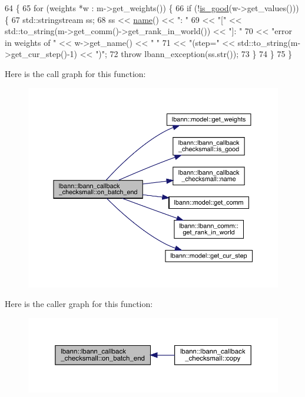 \begin{DoxyCode}
64                                                      \{
65   \textcolor{keywordflow}{for} (weights *w : m->get\_weights()) \{
66     \textcolor{keywordflow}{if} (!\hyperlink{classlbann_1_1lbann__callback__checksmall_afe78f539ba3b2ad3e6ae8c468850052c}{is\_good}(w->get\_values())) \{
67       std::stringstream ss;
68       ss << \hyperlink{classlbann_1_1lbann__callback__checksmall_acbdd897ecbe5a27b59db15ae7662e0f9}{name}() << \textcolor{stringliteral}{": "}
69          << \textcolor{stringliteral}{"["} << std::to\_string(m->get\_comm()->get\_rank\_in\_world()) << \textcolor{stringliteral}{"]: "}
70          << \textcolor{stringliteral}{"error in weights of "} << w->get\_name() << \textcolor{stringliteral}{" "}
71          << \textcolor{stringliteral}{"(step="} << std::to\_string(m->get\_cur\_step()-1) << \textcolor{stringliteral}{")"};
72       \textcolor{keywordflow}{throw} lbann\_exception(ss.str());
73     \}
74   \}
75 \}
\end{DoxyCode}
Here is the call graph for this function\+:\nopagebreak
\begin{figure}[H]
\begin{center}
\leavevmode
\includegraphics[width=350pt]{classlbann_1_1lbann__callback__checksmall_a00f1e6ad712638a107667a3e6695a6f0_cgraph}
\end{center}
\end{figure}
Here is the caller graph for this function\+:\nopagebreak
\begin{figure}[H]
\begin{center}
\leavevmode
\includegraphics[width=350pt]{classlbann_1_1lbann__callback__checksmall_a00f1e6ad712638a107667a3e6695a6f0_icgraph}
\end{center}
\end{figure}
